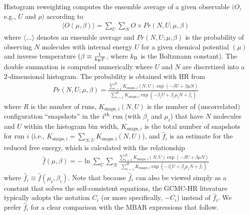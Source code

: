 \documentclass[journal=jced,manuscript=article]{achemso}
\begin{document}
Histogram reweighting computes the ensemble average of a given observable $(O$, e.g., $U$ and $\rho)$ according to
\begin{eqnarray} \label{eq: HR ave}
\langle O(\mu,\beta) \rangle = \sum_{U} \sum_{N} O \times Pr(N,U;\mu,\beta)
\end{eqnarray}
where $\langle \dots \rangle$ denotes an ensemble average and $Pr(N,U;\mu,\beta)$ is the probability of observing $N$ molecules with internal energy $U$ for a given chemical potential $(\mu)$ and inverse temperature $(\beta \equiv \frac{1}{k_{\rm B}T}$, where $k_{\rm B}$ is the Boltzmann constant). The double summation is computed numerically where $U$ and $N$ are discretized into a 2-dimensional histogram. The probability is obtained with HR from\cite{Ferrenberg1988,Ferrenberg1989}
\begin{eqnarray} \label{eq: HR prob}
Pr(N,U;\mu,\beta) = \frac{\sum_{i=1}^{R} K_{\mathrm{snaps},i}(N,U)  \exp(-\beta U + \beta \mu N)}{\sum_{i=1}^{R} K_{\mathrm{snaps}, i} \exp(-\beta_i U + \beta_i \mu_i N + \hat f_i)}
\end{eqnarray}
where $R$ is the number of runs, $K_{\mathrm{snaps},i}(N,U)$ is the number of (uncorrelated) configuration ``snapshots'' in the $i^{\rm th}$ run (with $\beta_i$ and $\mu_i$) that have $N$ molecules and $U$ within the histogram bin width, $K_{\mathrm{snaps}, i}$ is the total number of snapshots for run $i$ (i.e., $K_{\mathrm{snaps}, i} = \sum_{N,U} K_{\mathrm{snaps},i}(N,U)$), and $\hat f_i$ is an estimate for the reduced free energy, which is calculated with the relationship
\begin{eqnarray} \label{eq: Weights}
\hat f(\mu,\beta) = - \ln \sum_{U} \sum_{N} \frac{\sum_{i=1}^{R} K_{\mathrm{snaps},i}(N,U) \exp(-\beta U + \beta \mu N)}{\sum_{i=1}^{R} K_{\mathrm{snaps}, i} \exp(-\beta_i U + \beta_i \mu_i N + \hat f_i)}
\end{eqnarray}
where $\hat f_i \equiv \hat f(\mu_i,\beta_i)$. Note that because $\hat f_i$ can also be viewed simply as a constant that solves the self-consistent equations, the GCMC-HR literature \cite{Pana2000} typically adopts the notation $C_i$ (or more specifically, $-C_i$) instead of $\hat f_i$. We prefer $\hat f_i$ for a clear comparison with the MBAR expressions that follow.
\end{document}
